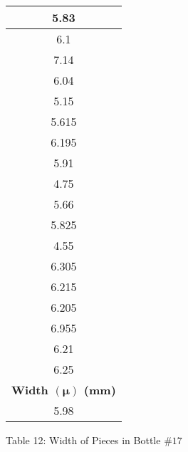\begin{center}
\begin{center}
\begin{tabular}{|c|}
        \hline
        5.83 \\
        \hline
        6.1 \\
        \hline
        7.14 \\
        \hline
        6.04 \\
        \hline
        5.15 \\
        \hline
        5.615 \\
        \hline
        6.195 \\
        \hline
        5.91 \\
        \hline
        4.75 \\
        \hline
        5.66 \\
        \hline
        5.825 \\
        \hline
        4.55 \\
        \hline
        6.305 \\
        \hline
        6.215 \\
        \hline
        6.205 \\
        \hline
        6.955 \\
        \hline
        6.21 \\
        \hline
        6.25 \\
        \hline
        \hline
        \textbf{Width $(\bm{\mu})$ (mm)}  \\
        \hline
        5.98 \\
        \hline
        \end{tabular}
\end{center}
Table 12: Width of Pieces in Bottle \(\#17\)
\end{center}